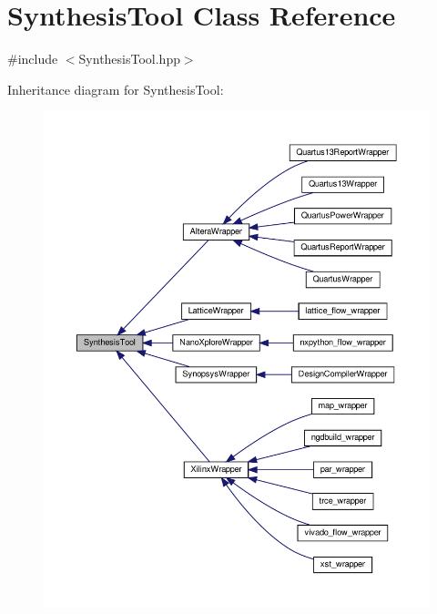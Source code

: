 \hypertarget{classSynthesisTool}{}\section{Synthesis\+Tool Class Reference}
\label{classSynthesisTool}


{\ttfamily \#include $<$Synthesis\+Tool.\+hpp$>$}



Inheritance diagram for Synthesis\+Tool\+:
\nopagebreak
\begin{figure}[H]
\begin{center}
\leavevmode
\includegraphics[width=350pt]{d7/dcd/classSynthesisTool__inherit__graph}
\end{center}
\end{figure}



